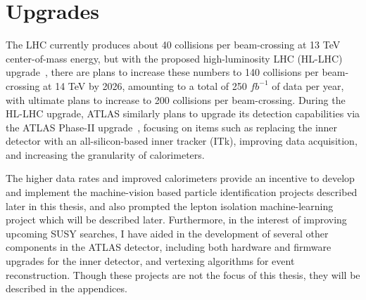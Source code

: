 \section{Upgrades}

The LHC currently produces about 40 collisions per beam-crossing at 13 TeV center-of-mass energy, but with the proposed high-luminosity LHC (HL-LHC) upgrade~\cite{HL_LHC}, there are plans to increase these numbers to 140 collisions per beam-crossing at 14 TeV by 2026, amounting to a total of 250 $fb^{-1}$ of data per year, with ultimate plans to increase to 200 collisions per beam-crossing. During the HL-LHC upgrade, ATLAS similarly plans to upgrade its detection capabilities via the ATLAS Phase-II upgrade~\cite{ATLAS_phaseII_TDR}, focusing on items such as replacing the inner detector with an all-silicon-based inner tracker (ITk), improving data acquisition, and increasing the granularity of calorimeters.

The higher data rates and improved calorimeters provide an incentive to develop and implement the machine-vision based particle identification projects described later in this thesis, and also prompted the lepton isolation machine-learning project which will be described later. Furthermore, in the interest of improving upcoming SUSY searches, I have aided in the development of several other components in the ATLAS detector, including both hardware and firmware upgrades for the inner detector, and vertexing algorithms for event reconstruction. Though these projects are not the focus of this thesis, they will be described in the appendices.